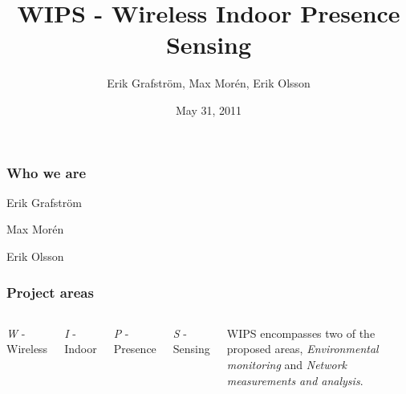 \documentclass{beamer}
\title{WIPS - Wireless Indoor Presence Sensing}
\author{Erik Grafström, Max Morén, Erik Olsson}
\date{May 31, 2011}
\begin{document}
\begin{frame}
	\titlepage
\end{frame}

\begin{frame} 
\frametitle{Who we are}

	\begin{block}

		Erik Grafström

	\end{block}

	\begin{block}

		Max Morén
	
	\end{block}
	
	\begin{block}
	
		Erik Olsson

	\end{block}

\end{frame}

\begin{frame} 
\frametitle{Project areas}

	\begin{columns}


	\begin{block}

		\emph{W} - Wireless

	\end{block}

	\begin{block}

		\emph{I} - Indoor
	
	\end{block}
	
	\begin{block}
	
		\emph{P} - Presence

	\end{block}

	\begin{block}
	
		\emph{S} - Sensing

	\end{block}


	WIPS encompasses two of the proposed areas, \emph{Environmental monitoring} 
	and \emph{Network measurements and analysis}.
	
	\end{columns}

\end{frame} 
\end{document}

